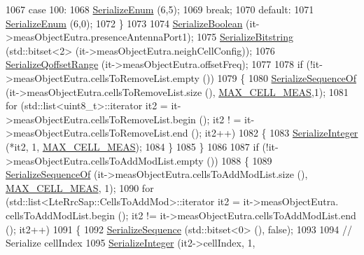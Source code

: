 \begin{DoxyCode}
1067             \textcolor{keywordflow}{case} 100:
1068               \hyperlink{classns3_1_1Asn1Header_ac8e56956823ab8e4470c09e162e7bf24}{SerializeEnum} (6,5);
1069               \textcolor{keywordflow}{break};
1070             \textcolor{keywordflow}{default}:
1071               \hyperlink{classns3_1_1Asn1Header_ac8e56956823ab8e4470c09e162e7bf24}{SerializeEnum} (6,0);
1072             \}
1073 
1074           \hyperlink{classns3_1_1Asn1Header_a28e3626acdffec71c0376f4f3e7e7ec4}{SerializeBoolean} (it->measObjectEutra.presenceAntennaPort1);
1075           \hyperlink{classns3_1_1Asn1Header_a0be8d507b87be07f85f35b906f8e5da7}{SerializeBitstring} (std::bitset<2> (it->measObjectEutra.neighCellConfig));
1076           \hyperlink{classns3_1_1RrcAsn1Header_ad1eb030398d2d91bce3493e8268a3e50}{SerializeQoffsetRange} (it->measObjectEutra.offsetFreq);
1077 
1078           \textcolor{keywordflow}{if} (!it->measObjectEutra.cellsToRemoveList.empty ())
1079             \{
1080               \hyperlink{classns3_1_1Asn1Header_a066b6dd077bde6b0c243f3eda2621277}{SerializeSequenceOf} (it->measObjectEutra.cellsToRemoveList.size (),
      \hyperlink{lte-rrc-header_8cc_a1d57dacc17deb664f3250c8c9bc5ba0e}{MAX\_CELL\_MEAS},1);
1081               \textcolor{keywordflow}{for} (std::list<uint8\_t>::iterator it2 = it->measObjectEutra.cellsToRemoveList.begin (); it2 !
      = it->measObjectEutra.cellsToRemoveList.end (); it2++)
1082                 \{
1083                   \hyperlink{classns3_1_1Asn1Header_ab1c3bd37730affa7473bc759d625c29a}{SerializeInteger} (*it2, 1, \hyperlink{lte-rrc-header_8cc_a1d57dacc17deb664f3250c8c9bc5ba0e}{MAX\_CELL\_MEAS});
1084                 \}
1085             \}
1086 
1087           \textcolor{keywordflow}{if} (!it->measObjectEutra.cellsToAddModList.empty ())
1088             \{
1089               \hyperlink{classns3_1_1Asn1Header_a066b6dd077bde6b0c243f3eda2621277}{SerializeSequenceOf} (it->measObjectEutra.cellsToAddModList.size (), 
      \hyperlink{lte-rrc-header_8cc_a1d57dacc17deb664f3250c8c9bc5ba0e}{MAX\_CELL\_MEAS}, 1);
1090               \textcolor{keywordflow}{for} (std::list<LteRrcSap::CellsToAddMod>::iterator it2 = it->measObjectEutra.
      cellsToAddModList.begin (); it2 != it->measObjectEutra.cellsToAddModList.end (); it2++)
1091                 \{
1092                   \hyperlink{classns3_1_1Asn1Header_aa9744858380443ed95836fed08799aed}{SerializeSequence} (std::bitset<0> (), \textcolor{keyword}{false});
1093 
1094                   \textcolor{comment}{// Serialize cellIndex}
1095                   \hyperlink{classns3_1_1Asn1Header_ab1c3bd37730affa7473bc759d625c29a}{SerializeInteger} (it2->cellIndex, 1, 

\end{DoxyCode}
